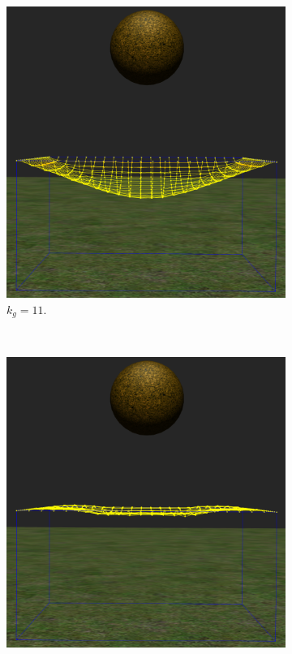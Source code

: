 \begin{figure}
 \centering
  \begin{subfigure}[b]{0.30\textwidth}
    \includegraphics[width=\textwidth]{Img/04/varPress1}
    \caption{$k_g=11$.}
  \end{subfigure}
~
  \begin{subfigure}[b]{0.30\textwidth}
    \includegraphics[width=\textwidth]{Img/04/varPress2}

\end{subfigure}
\end{figure}
